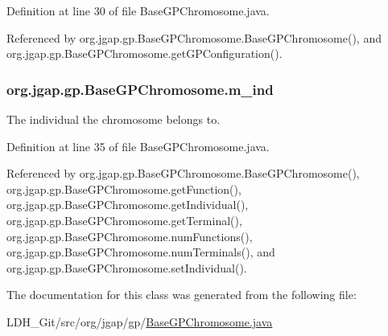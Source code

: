 Definition at line 30 of file Base\-G\-P\-Chromosome.\-java.



Referenced by org.\-jgap.\-gp.\-Base\-G\-P\-Chromosome.\-Base\-G\-P\-Chromosome(), and org.\-jgap.\-gp.\-Base\-G\-P\-Chromosome.\-get\-G\-P\-Configuration().

\hypertarget{classorg_1_1jgap_1_1gp_1_1_base_g_p_chromosome_abd0ec56e028878c736c081cea8dae1f7}{
\subsubsection[{m\-\_\-ind}]{ org.\-jgap.\-gp.\-Base\-G\-P\-Chromosome.\-m\-\_\-ind\hspace{0.3cm}{\ttfamily [private]}}}\label{classorg_1_1jgap_1_1gp_1_1_base_g_p_chromosome_abd0ec56e028878c736c081cea8dae1f7}
The individual the chromosome belongs to. 

Definition at line 35 of file Base\-G\-P\-Chromosome.\-java.



Referenced by org.\-jgap.\-gp.\-Base\-G\-P\-Chromosome.\-Base\-G\-P\-Chromosome(), org.\-jgap.\-gp.\-Base\-G\-P\-Chromosome.\-get\-Function(), org.\-jgap.\-gp.\-Base\-G\-P\-Chromosome.\-get\-Individual(), org.\-jgap.\-gp.\-Base\-G\-P\-Chromosome.\-get\-Terminal(), org.\-jgap.\-gp.\-Base\-G\-P\-Chromosome.\-num\-Functions(), org.\-jgap.\-gp.\-Base\-G\-P\-Chromosome.\-num\-Terminals(), and org.\-jgap.\-gp.\-Base\-G\-P\-Chromosome.\-set\-Individual().



The documentation for this class was generated from the following file\-:\begin{DoxyCompactItemize}
\item 
L\-D\-H\-\_\-\-Git/src/org/jgap/gp/\hyperlink{_base_g_p_chromosome_8java}{Base\-G\-P\-Chromosome.\-java}\end{DoxyCompactItemize}
